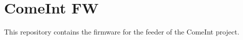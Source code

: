 \chapter{Come\+Int FW}
\hypertarget{md__c_1_2_users_2_p_2_documents_2_projeto___comedouro___p_i_p_e_2comeint-fw_2_r_e_a_d_m_e}{}\label{md__c_1_2_users_2_p_2_documents_2_projeto___comedouro___p_i_p_e_2comeint-fw_2_r_e_a_d_m_e}
\label{md__c_1_2_users_2_p_2_documents_2_projeto___comedouro___p_i_p_e_2comeint-fw_2_r_e_a_d_m_e_autotoc_md0}%
%
 This repository contains the firmware for the feeder of the Come\+Int project. 